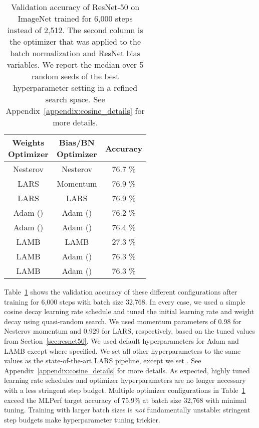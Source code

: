 \documentclass{article}
\begin{document}
\begin{table}[t]
\centering
\setlength{\extrarowheight}{3.5pt}
\begin{tabular}{|c|c|c|}
\hline
\specialcell{Weights\\Optimizer} & \specialcell{Bias/BN\\Optimizer} & Accuracy \\ \hline
Nesterov & Nesterov & 76.7 \% \\ \hline LARS & Momentum & 76.9 \% \\ \hline LARS & LARS & 76.9 \% \\ \hline Adam () & Adam () & 76.2 \% \\ \hline Adam () & Adam () & 76.4 \% \\ \hline LAMB & LAMB & 27.3 \% \\ \hline LAMB & Adam () & 76.3 \% \\ \hline LAMB & Adam () & 76.3 \% \\ \hline \end{tabular}
\caption{Validation accuracy of ResNet-50 on ImageNet trained for 6,000 steps instead of 2,512. The second column is the optimizer that was applied to the batch normalization and ResNet bias variables. We report the median over 5 random seeds of the best hyperparameter setting in a refined search space. See Appendix~\ref{appendix:cosine_details} for more details.}
\label{table:cosine_schedule}
\end{table}

Table~\ref{table:cosine_schedule} shows the validation accuracy of these different configurations after training for 6,000 steps with batch size 32,768. In every case, we used a simple cosine decay learning rate schedule and tuned the initial learning rate and weight decay using quasi-random search. We used momentum parameters of 0.98 for Nesterov momentum and 0.929 for LARS, respectively, based on the tuned values from Section~\ref{sec:resnet50}. We used default hyperparameters for Adam and LAMB except where specified. We set all other hyperparameters to the same values as the state-of-the-art LARS pipeline, except we set . See Appendix~\ref{appendix:cosine_details} for more details. As expected, highly tuned learning rate schedules and optimizer hyperparameters are no longer necessary with a less stringent step budget. Multiple optimizer configurations in Table~\ref{table:cosine_schedule} exceed the MLPerf target accuracy of 75.9\% at batch size 32,768 with minimal tuning. Training with larger batch sizes is \emph{not} fundamentally unstable: stringent step budgets make hyperparameter tuning trickier.
\end{document}
